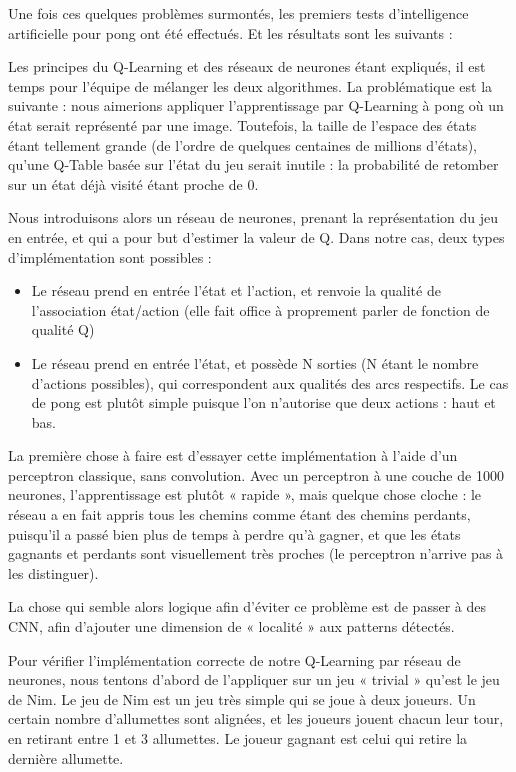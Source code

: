 \documentclass[
    10pt,
    a4paper,
    oneside,
    headinclude,footinclude,
    BCOR=5mm,
    captions=tableabove
]{scrartcl}
\begin{document}
	
Une fois ces quelques problèmes surmontés, les premiers tests d'intelligence artificielle pour pong ont été effectués. Et les résultats sont les suivants :

Les principes du Q-Learning et des réseaux de neurones étant expliqués, il est temps pour l’équipe de mélanger les deux algorithmes. La problématique est la suivante : nous aimerions appliquer l’apprentissage par Q-Learning à pong où un état serait représenté par une image. Toutefois, la taille de l’espace des états étant tellement grande (de l’ordre de quelques centaines de millions d’états), qu’une Q-Table basée sur l’état du jeu serait inutile : la probabilité de retomber sur un état déjà visité étant proche de 0.

Nous introduisons alors un réseau de neurones, prenant la représentation du jeu en entrée, et qui a pour but d’estimer la valeur de Q. Dans notre cas, deux types d’implémentation sont possibles :
\begin{itemize}
\item Le réseau prend en entrée l’état et l’action, et renvoie la qualité de l’association état/action (elle fait office à proprement parler de fonction de qualité Q)
\item Le réseau prend en entrée l’état, et possède N sorties (N étant le nombre d’actions possibles), qui correspondent aux qualités des arcs respectifs. Le cas de pong est plutôt simple puisque l’on n’autorise que deux actions : haut et bas.
\end{itemize}

La première chose à faire est d’essayer cette implémentation à l’aide d’un perceptron classique, sans convolution. Avec un perceptron à une couche de 1000 neurones, l’apprentissage est plutôt « rapide », mais quelque chose cloche : le réseau a en fait appris tous les chemins comme étant des chemins perdants, puisqu’il a passé bien plus de temps à perdre qu’à gagner, et que les états gagnants et perdants sont visuellement très proches (le perceptron n’arrive pas à les distinguer).

La chose qui semble alors logique afin d’éviter ce problème est de passer à des CNN, afin d’ajouter une dimension de « localité » aux patterns détectés.

Pour vérifier l’implémentation correcte de notre Q-Learning par réseau de neurones, nous tentons d’abord de l’appliquer sur un jeu « trivial » qu’est le jeu de Nim. Le jeu de Nim est un jeu très simple qui se joue à deux joueurs. Un certain nombre d’allumettes sont alignées, et les joueurs jouent chacun leur tour, en retirant entre 1 et 3 allumettes. Le joueur gagnant est celui qui retire la dernière allumette.
\end{document}
